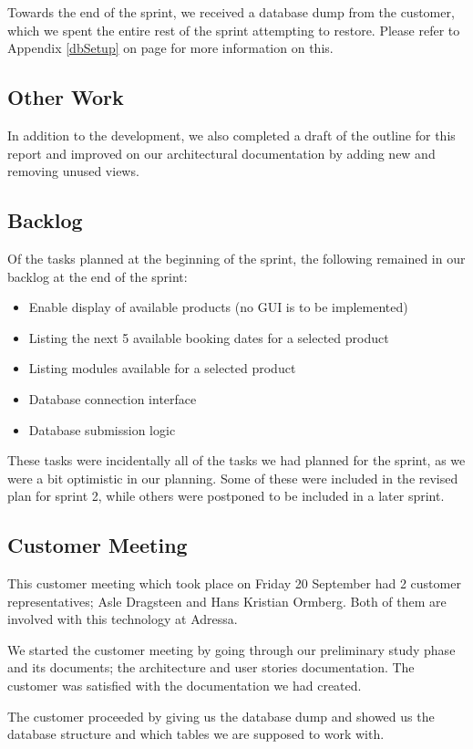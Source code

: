 Towards the end of the sprint, we received a database dump from the customer, which we spent the entire rest of the sprint attempting to restore. Please refer to Appendix \ref{dbSetup} on page \pageref{dbSetup} for more information on this.

\subsection{Other Work}
In addition to the development, we also completed a draft of the outline for this report and improved on our architectural documentation by adding new and removing unused views.

\subsection{Backlog}
Of the tasks planned at the beginning of the sprint, the following remained in our backlog at the end of the sprint:
\begin{itemize}
	\item Enable display of available products (no GUI is to be implemented)
	\item Listing the next 5 available booking dates for a selected product
	\item Listing modules available for a selected product
	\item Database connection interface
	\item Database submission logic
\end{itemize}

These tasks were incidentally all of the tasks we had planned for the sprint, as we were a bit optimistic in our planning. Some of these were included in the revised plan for sprint 2, while others were postponed to be included in a later sprint.

\subsection{Customer Meeting}
This customer meeting which took place on Friday 20 September had 2 customer representatives; Asle Dragsteen and Hans Kristian Ormberg. Both of them are involved with this technology at Adressa.
 
We started the customer meeting by going through our preliminary study phase and its documents; the architecture and user stories documentation. The customer was satisfied with the documentation we had created.

The customer proceeded by giving us the database dump and showed us the database structure and which tables we are supposed to work with.


